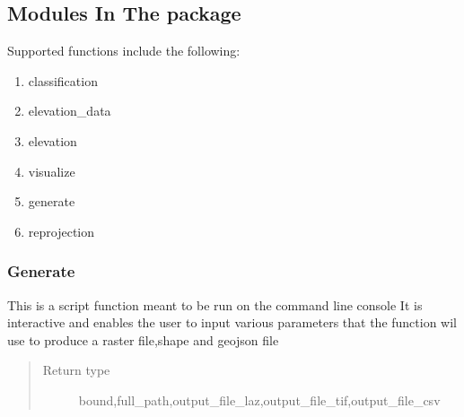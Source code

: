 \documentclass[letterpaper,10pt,english]{sphinxmanual}
\begin{document}
\subsection{Modules In  The package}
\label{\detokenize{tutorial:modules-in-the-package}}
\sphinxAtStartPar
Supported functions include the following:
\begin{enumerate}
%
\item {} 
\sphinxAtStartPar
classification

\item {} 
\sphinxAtStartPar
elevation\_data

\item {} 
\sphinxAtStartPar
elevation

\item {} 
\sphinxAtStartPar
visualize

\item {} 
\sphinxAtStartPar
generate

\item {} 
\sphinxAtStartPar
reprojection

\end{enumerate}


\subsubsection{Generate}
\label{\detokenize{tutorial:generate}}

\begin{fulllineitems}
\label{\detokenize{tutorial:gather_input}}
\sphinxAtStartPar
This is a script function meant to be run on the command line console
It is interactive and enables the user to input various parameters that the function wil use to produce a raster file,shape and geojson file
\begin{quote}\begin{description}
\item[{Return type}] \leavevmode
\sphinxAtStartPar
bound,full\_path,output\_file\_laz,output\_file\_tif,output\_file\_csv

\end{description}\end{quote}

\end{fulllineitems}
\end{document}
